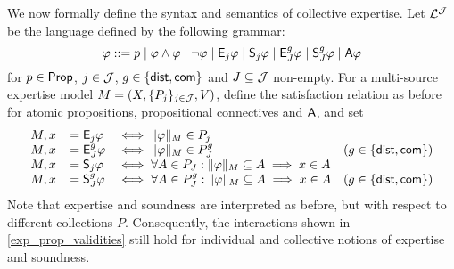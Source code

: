 We now formally define the syntax and semantics of collective expertise. Let
$\mathcal{L}^{\mathcal{J}}$ be the language defined by the following grammar:
\[
\varphi ::=
p \mid
\varphi \land \varphi \mid
\neg\varphi \mid
\mathsf{E}_j\varphi \mid \mathsf{S}_j\varphi \mid
\mathsf{E}_J^g\varphi \mid \mathsf{S}_J^g\varphi \mid
\mathsf{A}\varphi\]
for $p \in \mathsf{Prop}$, $j \in \mathcal{J}$, $g \in \{\mathsf{dist}, \mathsf{com}\}$ and
$J \subseteq \mathcal{J}$ non-empty. For a multi-source expertise model $M =
(X, \{P_j\}_{j \in \mathcal{J}}, V)$, define the satisfaction relation as before for
atomic propositions, propositional connectives and
$\mathsf{A}$, and set
\[
\begin{array}{lllr}
 M, x &\models \mathsf{E}_j\varphi &\iff \|\varphi\|_M \in P_j \\
 M, x &\models \mathsf{E}_J^g\varphi &\iff \|\varphi\|_M \in P_J^g
     & (g \in \{\mathsf{dist}, \mathsf{com}\}) \\
 M, x &\models \mathsf{S}_j\varphi &\iff \forall A \in P_J: \|\varphi\|_M \subseteq A
     \implies x \in A \\
 M, x &\models \mathsf{S}_J^g\varphi &\iff \forall A \in P_J^g: \|\varphi\|_M \subseteq A
     \implies x \in A
     & (g \in \{\mathsf{dist}, \mathsf{com}\})
\end{array}\]
Note that expertise and soundness are interpreted as before, but with respect
to different collections $P$. Consequently, the interactions
shown in \cref{exp_prop_validities} still hold for individual and collective
notions of expertise and soundness.

